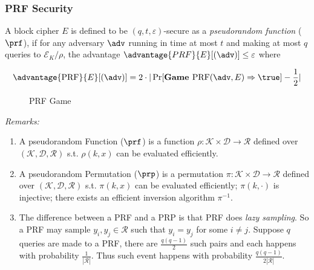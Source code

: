 \documentclass[11pt,a4paper]{article}
\newcommand{\PRF}{\text{PRF}}
\begin{document}
\subsubsection{PRF Security}
A block cipher  $E$ is defined to be $(q,t,\varepsilon)$-secure as a \textit{pseudorandom function} ($\prf$), if for any adversary $\adv$ running in time at most $t$ and making at most $q$ queries to $\mathcal{E}_K / \rho $, the advantage $\advantage{PRF}{E}[(\adv)] \leq \varepsilon$ where

$$
\advantage{\PRF}{E}[(\adv)] = 2 \cdot | \Pr[\textbf{Game } \PRF (\adv, E) \Rightarrow \true ] - \frac{1}{2} | 
$$ 


\begin{figure}[H]
\begin{pchstack}[ center , boxed, space=0.5cm]
\procedure[linenumbering]{$\textbf{Game }\PRF(\adv, E$)}{ 
b \sample \bin \\
K \sample \bin^k \\
\rho \sample \textsf{Funcs}[\bin^n] \\
b' \sample \adv^{\oracle[RoR] }() \\
\pcreturn b'=b
 }

\end{pchstack}
\caption{PRF Game}
\label{fig:prf-game}
\end{figure}

\textit{Remarks:}
\begin{enumerate}
\item A pseudorandom Function ($\prf$) is a function $\rho: \mathcal{K} \times \mathcal{D} \rightarrow \mathcal{R}$ defined over $(\mathcal{K},\mathcal{D},\mathcal{R})$ s.t. $\rho(k,x)$ can be evaluated efficiently. 
\item A pseudorandom Permutation ($\prp$) is a permutation $\pi: \mathcal{K} \times \mathcal{D} \rightarrow \mathcal{R}$ defined over $(\mathcal{K},\mathcal{D}, \mathcal{R})$ s.t. $\pi(k,x)$ can be evaluated efficiently; $\pi(k, \cdot)$ is injective; there exists an efficient inversion algorithm $\pi^{-1}$. 
\item The difference between a PRF and a PRP is that PRF does \textit{lazy sampling}. So a PRF may sample $y_i, y_j \in \mathcal{R}$ such that $y_i = y_j$ for some $i \neq j$. Suppose $q$ queries are made to a PRF, there are $\frac{q(q-1)}{2}$ such pairs and each happens with probability $\frac{1}{|\mathcal{R}|}$. Thus such event happens with probability $\frac{q(q-1)}{2|\mathcal{R}|}$. 
\end{enumerate}
\end{document}
